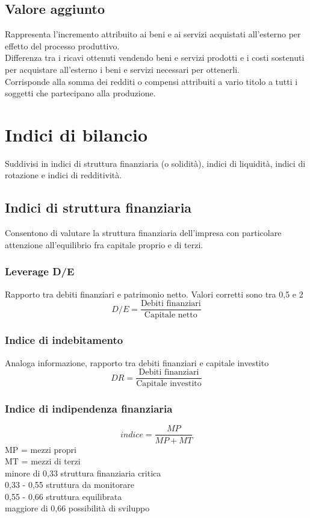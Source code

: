 \documentclass{report}
\begin{document}
	\subsection{Valore aggiunto}
	Rappresenta l'incremento attribuito ai beni e ai servizi acquistati all'esterno per effetto del processo produttivo.\\Differenza tra i ricavi ottenuti vendendo beni e servizi prodotti e i costi sostenuti per acquistare all'esterno i beni e servizi necessari per ottenerli.\\Corrisponde alla somma dei redditi o compensi attribuiti a vario titolo a tutti i soggetti che partecipano alla produzione.
	\section{Indici di bilancio}
	Suddivisi in indici di struttura finanziaria (o solidità), indici di liquidità, indici di rotazione e indici di redditività.
	\subsection{Indici di struttura finanziaria}
	Consentono di valutare la struttura finanziaria dell'impresa con particolare attenzione all'equilibrio fra capitale proprio e di terzi.
	\subsubsection{Leverage D/E}
	Rapporto tra debiti finanziari e patrimonio netto. Valori corretti sono tra 0,5 e 2
	\[D/E = \frac{\text{Debiti finanziari}}{\text{Capitale netto}}\]
	\subsubsection{Indice di indebitamento}
	Analoga informazione, rapporto tra debiti finanziari e capitale investito
	\[DR = \frac{\text{Debiti finanziari}}{\text{Capitale investito}}\]
	\subsubsection{Indice di indipendenza finanziaria}
	\[indice = \frac{MP}{MP+MT}\]
	MP = mezzi propri\\MT = mezzi di terzi\\minore di 0,33 struttura finanziaria critica\\0,33 - 0,55 struttura da monitorare\\0,55 - 0,66 struttura equilibrata\\maggiore di 0,66 possibilità di sviluppo
\end{document}
